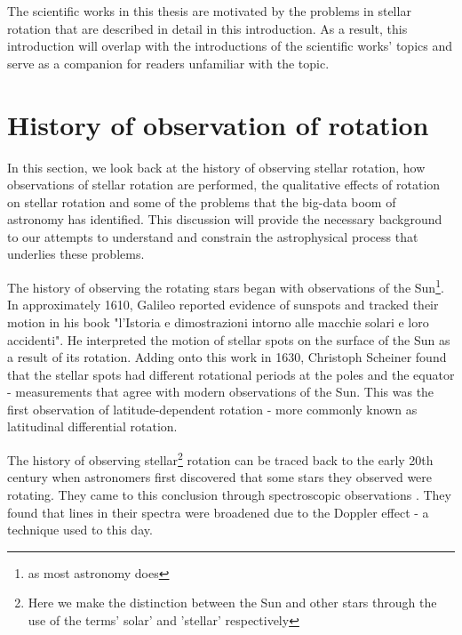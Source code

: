 The scientific works in this thesis are motivated by the problems in stellar rotation that are described in detail in this introduction. As a result, this introduction will overlap with the introductions of the scientific works' topics and serve as a companion for readers unfamiliar with the topic.

\section{History of observation of rotation}
\label{sec:history}

In this section, we look back at the history of observing stellar rotation, how observations of stellar rotation are performed, the qualitative effects of rotation on stellar rotation and some of the problems that the big-data boom of astronomy has identified.
This discussion will provide the necessary background to our attempts to understand and constrain the astrophysical process that underlies these problems.

The history of observing the rotating stars began with observations of the Sun\footnote{as most astronomy does}. 
In approximately 1610, Galileo reported evidence of sunspots and tracked their motion in his book "l'Istoria e dimostrazioni intorno alle macchie solari e loro accidenti". 
He interpreted the motion of stellar spots on the surface of the Sun as a result of its rotation. 
Adding onto this work in 1630, Christoph Scheiner found that the stellar spots had different rotational periods at the poles and the equator - measurements that agree with modern observations of the Sun. 
This was the first observation of latitude-dependent rotation - more commonly known as latitudinal differential rotation. 

The history of observing stellar\footnote{Here we make the distinction between the Sun and other stars through the use of the terms' solar' and 'stellar' respectively} rotation can be traced back to the early 20th century when astronomers first discovered that some stars they observed were rotating. 
They came to this conclusion through spectroscopic observations \citep{elvey_contours_1929, struve_stellar_1930, struve_axial_1930}.
They found that lines in their spectra were broadened due to the Doppler effect - a technique used to this day.


